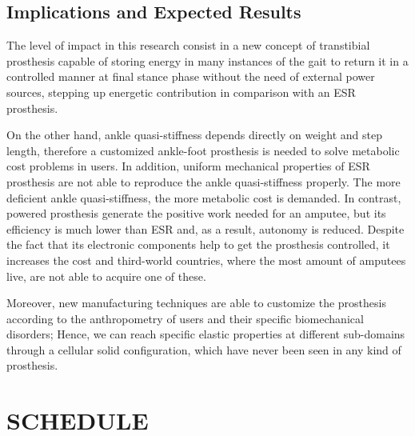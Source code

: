 \documentclass[12pt,english]{article}
\begin{document}
\subsection{Implications and Expected Results}

The level of impact in this research consist in a new concept of transtibial prosthesis capable of storing energy in many instances of the gait to return it in a controlled manner at final stance phase without the need of external power sources, stepping up energetic contribution in comparison with an ESR prosthesis.

On the other hand, ankle quasi-stiffness depends directly on weight and step length, therefore a customized ankle-foot prosthesis is needed to solve metabolic cost problems in users. In addition, uniform mechanical properties of ESR prosthesis are not able to reproduce the ankle quasi-stiffness properly. The more deficient ankle quasi-stiffness, the more metabolic cost is demanded. In contrast, powered prosthesis generate the positive work needed for an amputee, but its efficiency is much lower than ESR and, as a result, autonomy is reduced. Despite the fact that its electronic components help to get the prosthesis controlled, it increases the cost and third-world countries, where the most amount of amputees live, are not able to acquire one of these.

Moreover, new manufacturing techniques are able to customize the prosthesis according to the anthropometry of users and their specific biomechanical disorders; Hence, we can reach specific elastic properties at different sub-domains through a cellular solid configuration, which have never been seen in any kind of prosthesis.

\newpage
\section{SCHEDULE }
\end{document}
